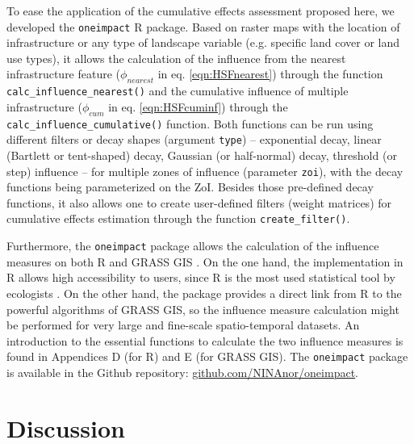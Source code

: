 \documentclass[titlepage]{article}
\begin{document}
To ease the application of the cumulative effects assessment proposed here, we developed the \verb|oneimpact| R package. Based on raster maps with the location of infrastructure or any type of landscape variable (e.g. specific land cover or land use types), it allows the calculation of the influence from the nearest infrastructure feature ($\phi_{nearest}$ in eq. \ref{eqn:HSFnearest}) through the function \verb|calc_influence_nearest()| and the cumulative influence of multiple infrastructure ($\phi_{cum}$ in eq. \ref{eqn:HSFcuminf}) through the \verb|calc_influence_cumulative()| function. Both functions can be run using different filters or decay shapes (argument \verb|type|) -- exponential decay, linear (Bartlett or tent-shaped) decay, Gaussian (or half-normal) decay, threshold (or step) influence -- for multiple zones of influence (parameter \verb|zoi|), with the decay functions being parameterized on the ZoI. Besides those pre-defined decay functions, it also allows one to create user-defined filters (weight matrices) for cumulative effects estimation through the function \verb|create_filter()|.

Furthermore, the \verb|oneimpact| package allows the calculation of the influence measures on both R \citep{r_core_team_r_2020} and GRASS GIS \citep{grass_development_team_geographic_2017}. On the one hand, the implementation in R allows high accessibility to users, since R is the most used statistical tool by ecologists \citep{lai_evaluating_2019}. On the other hand, the package provides a direct link from R to the powerful algorithms of GRASS GIS, so the influence measure calculation might be performed for very large and fine-scale spatio-temporal datasets. An introduction to the essential functions to calculate the two influence measures is found in Appendices D (for R) and E (for GRASS GIS). The \verb|oneimpact| package is available in the Github repository: \url{github.com/NINAnor/oneimpact}.


\section{Discussion}
\end{document}
